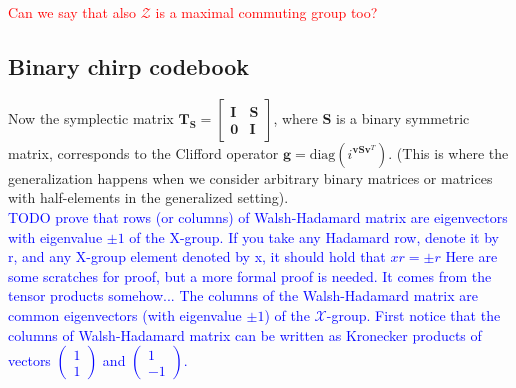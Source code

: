 \documentclass{article}
\begin{document}
	\textcolor{red}{Can we say that also $\mathcal{Z}$ is a maximal commuting group too?}
	
	
	\subsection*{Binary chirp codebook}
	Now the symplectic matrix $\mathbf{T}_\mathbf{S} = \begin{bmatrix} \mathbf{I} & \mathbf{S} \\ \mathbf{0} & \mathbf{I} \end{bmatrix}$, where $\mathbf{S}$ is a binary symmetric matrix, corresponds to the Clifford operator $\mathbf{g} = \text{diag}(i^{\mathbf{v}\mathbf{S}\mathbf{v}^T})$. (This is where the generalization happens when we consider arbitrary binary matrices or matrices with half-elements in the generalized setting). \\
	
	\textcolor{blue}{
	TODO prove that rows (or columns) of Walsh-Hadamard matrix are eigenvectors with eigenvalue $\pm 1$ of the X-group. If you take any Hadamard row, denote it by r, and any X-group element denoted by x, 
	 it should hold that $xr = \pm r$ 
}
\textcolor{blue}{
	 Here are some scratches for proof, but a more formal proof is needed. It comes from the tensor products somehow...
}
\textcolor{blue}{	
	The columns of the Walsh-Hadamard matrix are common eigenvectors (with eigenvalue $\pm 1$) of the $\mathcal{X}$-group. First notice that the columns of Walsh-Hadamard matrix can be written as Kronecker products of vectors $\begin{pmatrix} 1 \\ 1 \end{pmatrix}$ and $\begin{pmatrix} 1 \\ -1 \end{pmatrix}$.
}
\end{document}
